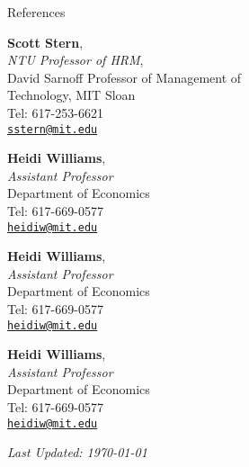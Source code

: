 \documentclass{resume} %
\begin{document}
\begin{rSection}{References}
\begin{multicols}{2}

{\bf Scott Stern}, \\
\emph{NTU Professor of HRM}, \\
David Sarnoff Professor of Management of \\ Technology, MIT Sloan \\
Tel: 617-253-6621 \\ 
\texttt{\href{mailto:sstern@mit.edu}{sstern@mit.edu}} 

{\bf Heidi Williams}, \\
\emph{Assistant Professor} \\
Department of Economics \\
Tel: 617-669-0577 \\
\texttt{\href{mailto:heidiw@mit.edu}{heidiw@mit.edu}}

\columnbreak

{\bf Heidi Williams}, \\
\emph{Assistant Professor} \\
Department of Economics \\
Tel: 617-669-0577 \\
\texttt{\href{mailto:heidiw@mit.edu}{heidiw@mit.edu}}

{\bf Heidi Williams}, \\
\emph{Assistant Professor} \\
Department of Economics \\
Tel: 617-669-0577 \\
\texttt{\href{mailto:heidiw@mit.edu}{heidiw@mit.edu}}





\end{multicols}

\end{rSection}

%
\vspace{0.3cm}
\begin{center}
\emph{Last Updated: \today} 
\end{center}
\end{document}
